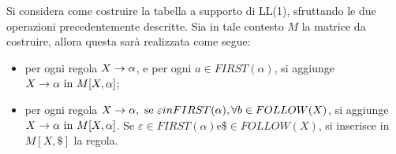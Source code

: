 \documentclass{subfiles}
\begin{document}
Si considera come costruire la tabella a supporto di LL(1), sfruttando le due operazioni precedentemente descritte.
Sia in tale contesto \(M\) la matrice da costruire, allora questa sarà realizzata come segue:
\begin{itemize}
    \item per ogni regola \(\Grammar{X}{\alpha}\), e per ogni \(a \in FIRST(\alpha)\), si aggiunge \(\Grammar{X}{\alpha} \text{in} M[X, \alpha]\);
    \item per ogni regola \(\Grammar{X}{\alpha}, \text{se} \varepsilon in FIRST(\alpha), \forall b \in FOLLOW(X)\),
          si aggiunge \(\Grammar{X}{\alpha} \text{in} M[X, \alpha]\).
          Se \(\varepsilon \in FIRST(\alpha) \text{e} \$ \in FOLLOW(X)\), si inserisce in \(M[X, \$]\) la regola.
\end{itemize}
\end{document}

